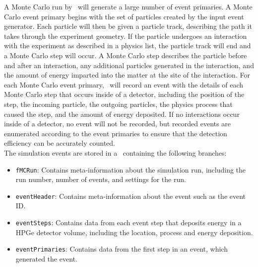 \documentclass[/main.tex]{subfiles}
\begin{document}
A Monte Carlo run by \geant\ will generate a large number of event primaries.
A Monte Carlo event primary begins with the set of particles created by the input event generator.
Each particle will then be given a particle track, describing the path it takes through the experiment geometry.
If the particle undergoes an interaction with the experiment as described in a physics list, the particle track will end and a Monte Carlo step will occur.
A Monte Carlo step describes the particle before and after an interaction, any additional particles generated in the interaction, and the amount of energy imparted into the matter at the site of the interaction.
For each Monte Carlo event primary, \Mage\ will record an event with the details of each Monte Carlo step that occurs inside of a detector, including the position of the step, the incoming particle, the outgoing particles, the physics process that caused the step, and the amount of energy deposited.
If no interactions occur inside of a detector, no event will not be recorded, but recorded events are enumerated according to the event primaries to ensure that the detection efficiency can be accurately counted.
\\
The simulation events are stored in a \TTree\ containing the following branches:
\begin{itemize}
\item{\texttt{fMCRun}:}
  Contains meta-information about the simulation run, including the run number, number of events, and settings for the run.
\item{\texttt{eventHeader}:}
  Contains meta-information about the event such as the event ID.
\item{\texttt{eventSteps}:}
  Contains data from each event step that deposits energy in a HPGe detector volume, including the location, process and energy deposition.
\item{\texttt{eventPrimaries}:}
  Contains data from the first step in an event, which generated the event.
\end{itemize}
\end{document}
